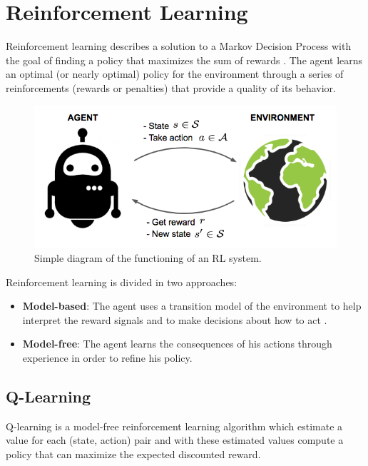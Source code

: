 \section{Reinforcement Learning}
Reinforcement learning \cite{sutton2018reinforcement} describes a solution to a Markov Decision Process
with the goal of finding a policy that maximizes the sum of rewards \cite{huys2014reward}.
%
The agent learns an optimal (or nearly optimal) policy for the environment \cite{russell2002artificial}
through a series of reinforcements (rewards or penalties) that provide a quality of its behavior.

\begin{figure}[ht]
    \centering
    \includegraphics[scale=0.4]{images/RL_illustration.png}
    \caption{Simple diagram of the functioning of an RL system.}
    \label{fig:RL_illustration}
\end{figure}

\newpage
\noindent
Reinforcement learning is divided in two approaches:
\begin{itemize}
    \item \textbf{Model-based}:
          The agent uses a transition model of the environment to help interpret the reward signals and to make decisions about how to act \cite{russell2021artificial}.
    \item \textbf{Model-free}:
          The agent learns the consequences of his actions through experience in order to refine his policy.
\end{itemize}


\subsection{Q-Learning}
Q-learning \cite{watkins1992q} is a model-free reinforcement learning algorithm which estimate a value for each (state, action) pair
and with these estimated values compute a policy that can maximize the expected discounted reward.

